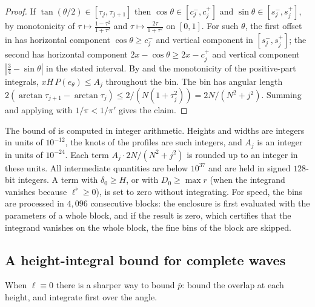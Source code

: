 \documentclass[11pt,colorlinks]{charlie}
\begin{document}
\begin{proof}
If $\tan(\theta/2)\in[\tau_j,\tau_{j+1}]$ then $\cos\theta\in[c^-_j,c^+_j]$ and $\sin\theta\in[s^-_j,s^+_j]$, by monotonicity of $\tau\mapsto\frac{1-\tau^2}{1+\tau^2}$ and $\tau\mapsto\frac{2\tau}{1+\tau^2}$ on $[0,1]$. For such $\theta$, the first offset in  has horizontal component $\cos\theta\ge c^-_j$ and vertical component in $[s^-_j,s^+_j]$; the second has horizontal component $2x-\cos\theta\ge2x-c^+_j$ and vertical component $|\tfrac34-\sin\theta|$ in the stated interval. By  and the monotonicity of the positive-part integrals, $xH\,P(e_\theta)\le A_j$ throughout the bin. The bin has angular length $2(\arctan\tau_{j+1}-\arctan\tau_j)\le 2/(N(1+\tau_j^2))=2N/(N^2+j^2)$. Summing and applying  with $1/\pi<1/\pi'$ gives the claim.
\end{proof}

The bound of  is computed in integer arithmetic. Heights and widths are integers in units of $10^{-12}$, the knots of the profiles are such integers, and $A_j$ is an integer in units of $10^{-24}$. Each term $A_j\cdot2N/(N^2+j^2)$ is rounded up to an integer in these units. All intermediate quantities are below $10^{37}$ and are held in signed $128$-bit integers. A term with $\delta_0\ge H$, or with $D_0\ge\max r$ (when the integrand vanishes because $\ell^\flat\ge0$), is set to zero without integrating. For speed, the bins are processed in $4{,}096$ consecutive blocks: the enclosure is first evaluated with the parameters of a whole block, and if the result is zero, which certifies that the integrand vanishes on the whole block, the fine bins of the block are skipped.

\subsection{A height-integral bound for complete waves}\label{sec:heightint}
When $\ell\equiv0$ there is a sharper way to bound $\bar p$: bound the overlap at each height, and integrate first over the angle.
\end{document}
